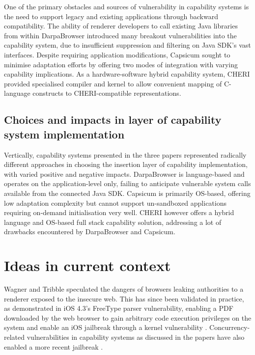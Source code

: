 \documentclass[11pt]{article}
\begin{document}
One of the primary obstacles and sources of vulnerability in capability systems is the need to support legacy and existing applications through backward compatibility. The ability of renderer developers to call existing Java libraries from within DarpaBrowser \cite[5.2]{wagner2002security} introduced many breakout vulnerabilities into the capability system, due to insufficient suppression and filtering on Java SDK's vast interfaces. Despite requiring application modifications, Capsicum \cite[Sec. 4]{watson2010capsicum} sought to minimise adaptation efforts by offering two modes of integration with varying capability implications. As a hardware-software hybrid capability system, CHERI \cite[Sec. IV]{watson2015cheri} provided specialised compiler and kernel to allow convenient mapping of C-language constructs to CHERI-compatible representations.

\subsection{Choices and impacts in layer of capability system implementation}

Vertically, capability systems presented in the three papers represented radically different approaches in choosing the insertion layer of capability implementation, with varied positive and negative impacts. DarpaBrowser \cite{wagner2002security} is language-based and operates on the application-level only, failing to anticipate vulnerable system calls available from the connected Java SDK. Capsicum \cite{watson2010capsicum} is primarily OS-based, offering low adaptation complexity but cannot support un-sandboxed applications requiring on-demand initialisation very well. CHERI \cite{watson2015cheri} however offers a hybrid language and OS-based full stack capability solution, addressing a lot of drawbacks encountered by DarpaBrowser and Capsicum.
 
\section{Ideas in current context}

Wagner and Tribble \cite[Sec. 3]{wagner2002security} speculated the dangers of browsers leaking authorities to a renderer exposed to the insecure web. This has since been validated in practice, as demonstrated in iOS 4.3's FreeType parser vulnerability, enabling a PDF downloaded by the web browser to gain arbitrary code execution privileges on the system and enable an iOS jailbreak through a kernel vulnerability \cite{ioscve}. Concurrency-related vulnerabilities in capability systems as discussed in the papers have also enabled a more recent jailbreak \cite{ianbeer}.
\end{document}
